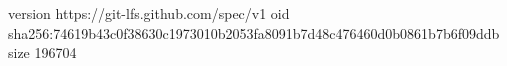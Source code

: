 version https://git-lfs.github.com/spec/v1
oid sha256:74619b43c0f38630c1973010b2053fa8091b7d48c476460d0b0861b7b6f09ddb
size 196704
